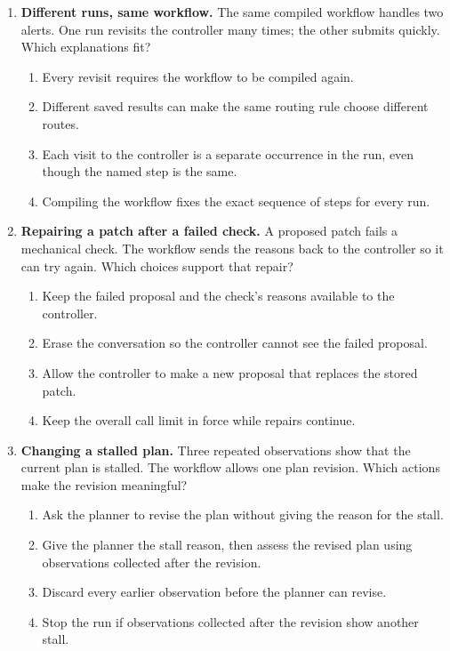 \begin{enumerate}[start=21,itemsep=0.7\baselineskip]
\item\label{exercise:24} \begin{minipage}[t]{\linewidth}
\textbf{Different runs, same workflow.} The same compiled workflow handles two alerts. One run revisits the controller many times; the other submits quickly. Which explanations fit?
\begin{enumerate}[label=\textnormal{(\Alph*)},leftmargin=*,itemsep=0pt]
\item Every revisit requires the workflow to be compiled again.
\item Different saved results can make the same routing rule choose different routes.
\item Each visit to the controller is a separate occurrence in the run, even though the named step is the same.
\item Compiling the workflow fixes the exact sequence of steps for every run.
\end{enumerate}
\end{minipage}

\item\label{exercise:25} \begin{minipage}[t]{\linewidth}
\textbf{Repairing a patch after a failed check.} A proposed patch fails a mechanical check. The workflow sends the reasons back to the controller so it can try again. Which choices support that repair?
\begin{enumerate}[label=\textnormal{(\Alph*)},leftmargin=*,itemsep=0pt]
\item Keep the failed proposal and the check's reasons available to the controller.
\item Erase the conversation so the controller cannot see the failed proposal.
\item Allow the controller to make a new proposal that replaces the stored patch.
\item Keep the overall call limit in force while repairs continue.
\end{enumerate}
\end{minipage}

\item\label{exercise:26} \begin{minipage}[t]{\linewidth}
\textbf{Changing a stalled plan.} Three repeated observations show that the current plan is stalled. The workflow allows one plan revision. Which actions make the revision meaningful?
\begin{enumerate}[label=\textnormal{(\Alph*)},leftmargin=*,itemsep=0pt]
\item Ask the planner to revise the plan without giving the reason for the stall.
\item Give the planner the stall reason, then assess the revised plan using observations collected after the revision.
\item Discard every earlier observation before the planner can revise.
\item Stop the run if observations collected after the revision show another stall.
\end{enumerate}
\end{minipage}


\end{enumerate}
